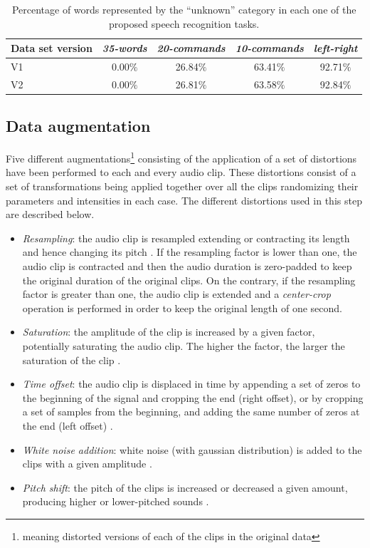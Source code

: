 \begin{table}[ht]
	\centering
	\caption[Percentage of ``unknown'' speech commands in each task]{Percentage of words represented by the ``unknown'' category in each one of the proposed speech recognition tasks. }
	\label{tab:unknowns}
	\begin{tabular}{lcccc}
		\hline
		Data set version & \textit{35-words} & \textit{20-commands} & \textit{10-commands} & \textit{left-right}  \\
		\hline
		V1 	& 0.00$\%$  &  26.84$\%$  &	  63.41$\%$  &	92.71$\%$ \\
		V2 	& 0.00$\%$  &	26.81$\%$  &  63.58$\%$  &	92.84$\%$ \\
		\bottomrule
	\end{tabular}
\end{table}


\subsection{Data augmentation}
Five different augmentations\footnote{meaning distorted versions of each of the clips in the original data} consisting of the application of a set of distortions have been performed to each and every audio clip. These distortions consist of a set of transformations being applied together over all the clips randomizing their parameters and intensities in each case. The different distortions used in this step are described below.

\begin{itemize}
	\item \textit{Resampling}: the audio clip is resampled extending or contracting its length and hence changing its pitch \autocite{Proakis2007}. If the resampling factor is lower than one, the audio clip is contracted and then the audio duration is zero-padded to keep the original duration of the original clips. On the contrary, if the resampling factor is greater than one, the audio clip is extended and a \textit{center-crop} operation is performed in order to keep the original length of one second.
	\item \textit{Saturation}: the amplitude of the clip is increased by a given factor, potentially saturating the audio clip. The higher the factor, the larger the saturation of the clip \autocite{Proakis2007}.
	\item \textit{Time offset}: the audio clip is displaced in time by appending a set of zeros to the beginning of the signal and cropping the end (right offset), or by cropping a set of samples from the beginning, and adding the same number of zeros at the end (left offset) \autocite{Proakis2007}.
	\item \textit{White noise addition}: white noise (with gaussian distribution) is added to the clips with a given amplitude \autocite{Proakis2007}.
	\item \textit{Pitch shift}: the pitch of the clips is increased or decreased a given amount, producing higher or lower-pitched sounds \autocite{Proakis2007, Szymon2016}.
\end{itemize}

